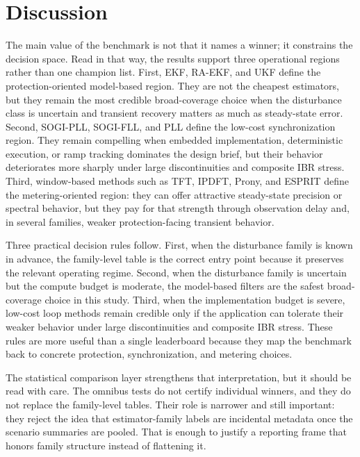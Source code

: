 \section{Discussion}
\label{sec:discussion}

The main value of the benchmark is not that it names a winner; it constrains the decision space. Read in that way, the results support three operational regions rather than one champion list. First, EKF, RA-EKF, and UKF define the protection-oriented model-based region. They are not the cheapest estimators, but they remain the most credible broad-coverage choice when the disturbance class is uncertain and transient recovery matters as much as steady-state error. Second, SOGI-PLL, SOGI-FLL, and PLL define the low-cost synchronization region. They remain compelling when embedded implementation, deterministic execution, or ramp tracking dominates the design brief, but their behavior deteriorates more sharply under large discontinuities and composite IBR stress. Third, window-based methods such as TFT, IPDFT, Prony, and ESPRIT define the metering-oriented region: they can offer attractive steady-state precision or spectral behavior, but they pay for that strength through observation delay and, in several families, weaker protection-facing transient behavior.

Three practical decision rules follow. First, when the disturbance family is known in advance, the family-level table is the correct entry point because it preserves the relevant operating regime. Second, when the disturbance family is uncertain but the compute budget is moderate, the model-based filters are the safest broad-coverage choice in this study. Third, when the implementation budget is severe, low-cost loop methods remain credible only if the application can tolerate their weaker behavior under large discontinuities and composite IBR stress. These rules are more useful than a single leaderboard because they map the benchmark back to concrete protection, synchronization, and metering choices.

The statistical comparison layer strengthens that interpretation, but it should be read with care. The omnibus tests do not certify individual winners, and they do not replace the family-level tables. Their role is narrower and still important: they reject the idea that estimator-family labels are incidental metadata once the scenario summaries are pooled. That is enough to justify a reporting frame that honors family structure instead of flattening it.

